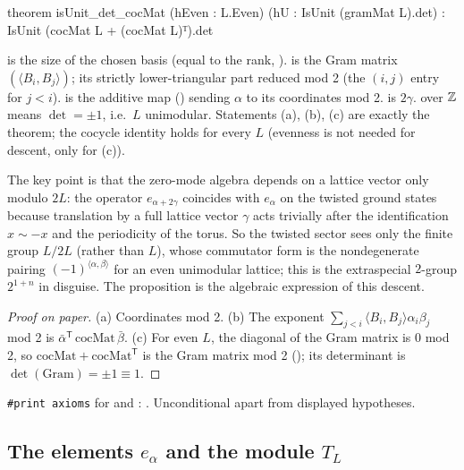 \begin{leancode}
theorem isUnit_det_cocMat (hEven : L.Even) (hU : IsUnit (gramMat L).det) :
    IsUnit (cocMat L + (cocMat L)ᵀ).det
\end{leancode}
\begin{dictionary}
 is the size of the chosen basis (equal to the rank, ).
 is the Gram matrix $(\langle B_i,B_j\rangle)$;  its strictly
lower-triangular part reduced mod 2 (the $(i,j)$ entry for $j<i$).   is the additive
map () sending $\alpha$ to its coordinates mod 2.   is $2\gamma$.
 over ${\mathbb{Z}}$ means $\det=\pm1$, i.e.\ $L$ unimodular.  Statements (a),
(b), (c) are exactly the theorem; the cocycle identity holds for every $L$ (evenness is not
needed for descent, only for (c)).
\end{dictionary}

\begin{physics}
The key point is that the zero-mode algebra depends on a lattice vector only modulo $2L$: the operator $e_{\alpha+2\gamma}$ coincides with $e_\alpha$ on the twisted ground states because translation by a full lattice vector $\gamma$ acts trivially after the identification $x\sim-x$ and the periodicity of the torus. So the twisted sector sees only the finite group $L/2L$ (rather than $L$), whose commutator form is the nondegenerate pairing $(-1)^{\langle\alpha,\beta\rangle}$ for an even unimodular lattice; this is the extraspecial $2$-group $2^{1+n}$ in disguise. The proposition is the algebraic expression of this descent.
\end{physics}
\begin{proof}[Proof on paper]
(a) Coordinates mod 2.  (b) The exponent $\sum_{j<i}\langle B_i,B_j\rangle\alpha_i\beta_j$ mod 2 is
$\bar\alpha^{\mathsf T}\,\mathrm{cocMat}\,\bar\beta$.  (c) For even $L$, the diagonal of the Gram
matrix is $0$ mod 2, so $\mathrm{cocMat}+\mathrm{cocMat}^{\mathsf T}$ is the Gram matrix mod 2
(); its determinant is $\det(\mathrm{Gram})=\pm1\equiv1$.
\end{proof}
\begin{status}
\texttt{\#print axioms} for  and : .  Unconditional apart from displayed hypotheses.
\end{status}

\subsection{The elements \texorpdfstring{$e_\alpha$}{e alpha} and the module \texorpdfstring{$T_L$}{T L}}

